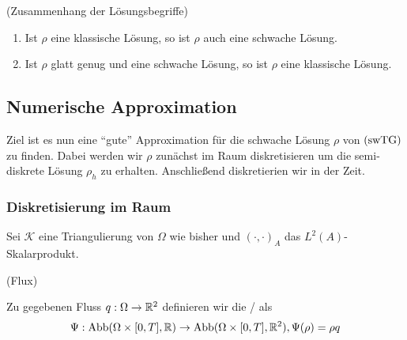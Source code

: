\begin{Lemma}(Zusammenhang der Lösungsbegriffe)
	
	\begin{enumerate}
		\item Ist $ \rho $ eine klassische Lösung, so ist $ \rho $ auch eine schwache Lösung.
		\item Ist $ \rho $ glatt genug und eine schwache Lösung, so ist $ \rho $ eine klassische Lösung. 
	\end{enumerate}
\end{Lemma}

\subsection{Numerische Approximation}
Ziel ist es nun eine \enquote{gute} Approximation für die schwache Lösung $ \rho $ von $ \operatorname{(swTG)} $ zu finden. Dabei werden wir $ \rho $ zunächst im Raum diskretisieren um die semi-diskrete Lösung $ \rho_h $ zu erhalten. Anschließend diskretierien wir in der Zeit.

\subsubsection{Diskretisierung im Raum}
 Sei $ \mathcal{K} $ eine Triangulierung von $ \Omega $ wie bisher und $ (\cdot,\cdot)_A $ das $ L^2(A) $-Skalarprodukt. 
\begin{define}(Flux)
	
	Zu gegebenen Fluss $ q:\Omega \to \mathbb{R}^2 $ definieren wir die / als
	\[ \Psi: \operatorname{Abb}(\Omega \times [0,T], \mathbb{R}) \to \operatorname{Abb}(\Omega \times [0,T], \mathbb{R}^2), \Psi(\rho) = \rho q \]
\end{define}

